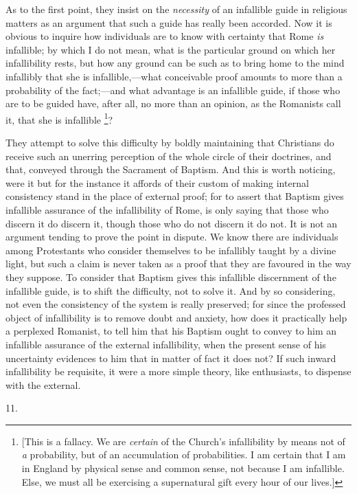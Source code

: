 As to the first point, they insist on the \emph{necessity} of an
infallible guide in religious matters as an argument that such a guide
has really been accorded. Now it is obvious to inquire how individuals
are to know with certainty that Rome \emph{is} infallible; by which I
do not mean, what is the particular ground on which her infallibility
rests, but how any ground can be such as to bring home to the mind
infallibly that she is infallible,—what conceivable proof amounts to
more than a probability of the fact;—and what advantage is an
infallible guide, if those who are to be guided have, after all, no
more than an opinion, as the Romanists call it, that she is infallible
\footnote{[This is a fallacy. We are \emph{certain} of the
Church's infallibility by means not of \emph{a} probability, but of an
accumulation of probabilities. I am certain that I am in England by
physical sense and common sense, not because I am infallible. Else, we
must all be exercising a supernatural gift every hour of our lives.]}?

They attempt to solve this difficulty by boldly maintaining that
Christians do receive such an unerring perception of the whole circle
of their doctrines, and that, conveyed through the Sacrament of
Baptism. And this is worth noticing, were it but for the instance it
affords of their custom of making internal consistency stand in the
place of external proof; for to assert that Baptism gives infallible
assurance of the infallibility of Rome, is only saying that those who
discern it do discern it, though those who do not discern it do not.
It is not an argument tending to prove the point in dispute. We know
there are individuals among Protestants who consider themselves to be
infallibly taught by a divine light, but such a claim is never taken
as a proof that they are favoured in the way they suppose. To consider
that Baptism gives this infallible discernment of the infallible
guide, is to shift the difficulty, not to solve it. And by so
considering, not even the consistency of the system is really
preserved; for since the professed object of infallibility is to
remove doubt and anxiety, how does it practically help a perplexed
Romanist, to tell him that his Baptism ought to convey to him an
infallible assurance of the external infallibility, when the present
sense of his uncertainty evidences to him that in matter of fact it
does not? If such inward infallibility be requisite, it were a more
simple theory, like enthusiasts, to dispense with the external.

11.

